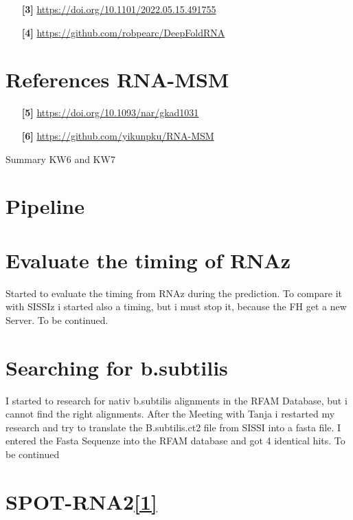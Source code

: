 \documentclass{article}
\begin{document}
\begin{large}
\begin{large}
\begin{itemize}
    \item[\textbf{[3]}] \url{https://doi.org/10.1101/2022.05.15.491755} \par
    \item[\textbf{[4]}] \url{https://github.com/robpearc/DeepFoldRNA}
\end{itemize}

\section{References RNA-MSM}

\begin{itemize}
    \item[\textbf{[5]}] \url{https://doi.org/10.1093/nar/gkad1031} \par
    \item[\textbf{[6]}] \url{https://github.com/yikunpku/RNA-MSM}
\end{itemize}

Summary KW6 and KW7

\begin{large}

\section{Pipeline}

\section{Evaluate the timing of RNAz}

Started to evaluate the timing from RNAz during the prediction. 
To compare it with SISSIz i started also a timing, but i must stop it, because the FH get a new Server. To be continued.

\section{Searching for b.subtilis}

I started to research for nativ b.subtilis alignments in the RFAM Database, but i cannot find the right alignments. After the Meeting with Tanja i restarted my research and try to translate the B.subtilis.ct2 file from SISSI into a fasta file. 
I entered the Fasta Sequenze into the RFAM database and got 4 identical hits. To be continued

\clearpage

\section{SPOT-RNA2\href{https://doi.org/10.1093/bioinformatics/btab165}{\textbf{[1]}}}


\end{large}
\end{large}
\end{large}
\end{document}

